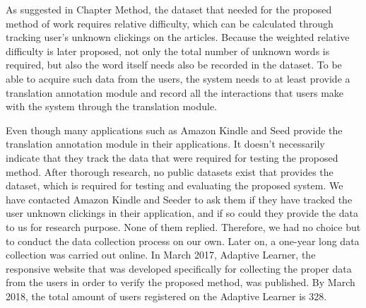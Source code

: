 

As suggested in Chapter Method, the dataset that needed for the proposed method of work requires relative difficulty, which can be calculated through tracking user's unknown clickings on the articles. Because the weighted relative difficulty is later proposed, not only the total number of unknown words is required, but also the word itself needs also be recorded in the dataset. To be able to acquire such data from the users, the system needs to at least provide a translation annotation module and record all the interactions that users make with the system through the translation module.

Even though many applications such as Amazon Kindle \cite{Kindle} and Seed \cite{Seed} provide the translation annotation module in their applications. It doesn't necessarily indicate that they track the data that were required for testing the proposed method. After thorough research, no public datasets exist that provides the dataset, which is required for testing and evaluating the proposed system. We have contacted Amazon Kindle and Seeder to ask them if they have tracked the user unknown clickings in their application, and if so could they provide the data to us for research purpose. None of them replied. Therefore, we had no choice but to conduct the data collection process on our own. Later on, a one-year long data collection was carried out online. In March 2017, Adaptive Learner, the responsive website that was developed specifically for collecting the proper data from the users in order to verify the proposed method, was published. By March 2018, the total amount of users registered on the Adaptive Learner is 328. 

